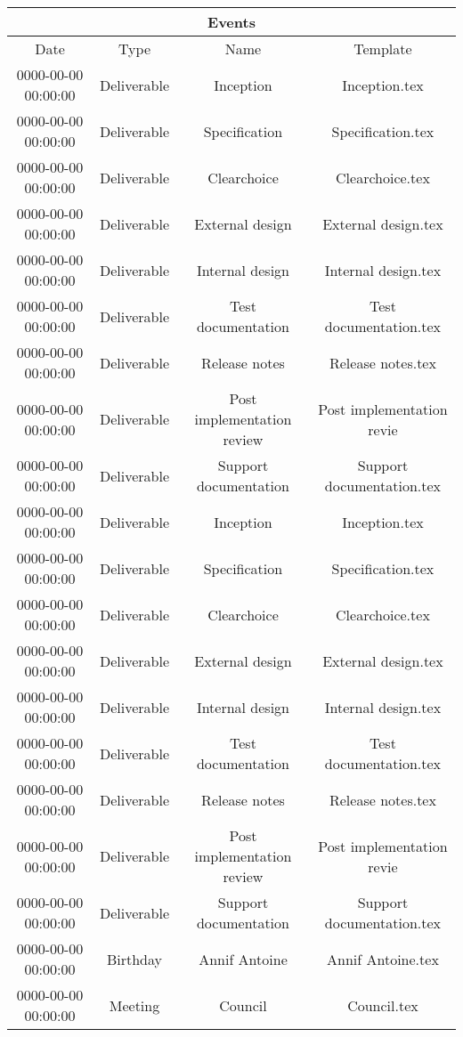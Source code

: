 \begin{longtable}{|c|c|c|c|}
\hline
\multicolumn{4}{|c|}{Events} \\
\hline
Date & Type & Name & Template\\
\hline
0000-00-00 00:00:00 & Deliverable & Inception & Inception.tex\\
\hline
0000-00-00 00:00:00 & Deliverable & Specification & Specification.tex\\
\hline
0000-00-00 00:00:00 & Deliverable & Clearchoice & Clearchoice.tex\\
\hline
0000-00-00 00:00:00 & Deliverable & External design & External design.tex\\
\hline
0000-00-00 00:00:00 & Deliverable & Internal design & Internal design.tex\\
\hline
0000-00-00 00:00:00 & Deliverable & Test documentation & Test documentation.tex\\
\hline
0000-00-00 00:00:00 & Deliverable & Release notes & Release notes.tex\\
\hline
0000-00-00 00:00:00 & Deliverable & Post implementation review & Post implementation revie\\
\hline
0000-00-00 00:00:00 & Deliverable & Support documentation & Support documentation.tex\\
\hline
0000-00-00 00:00:00 & Deliverable & Inception & Inception.tex\\
\hline
0000-00-00 00:00:00 & Deliverable & Specification & Specification.tex\\
\hline
0000-00-00 00:00:00 & Deliverable & Clearchoice & Clearchoice.tex\\
\hline
0000-00-00 00:00:00 & Deliverable & External design & External design.tex\\
\hline
0000-00-00 00:00:00 & Deliverable & Internal design & Internal design.tex\\
\hline
0000-00-00 00:00:00 & Deliverable & Test documentation & Test documentation.tex\\
\hline
0000-00-00 00:00:00 & Deliverable & Release notes & Release notes.tex\\
\hline
0000-00-00 00:00:00 & Deliverable & Post implementation review & Post implementation revie\\
\hline
0000-00-00 00:00:00 & Deliverable & Support documentation & Support documentation.tex\\
\hline
0000-00-00 00:00:00 & Birthday & Annif Antoine & Annif Antoine.tex\\
\hline
0000-00-00 00:00:00 & Meeting & Council & Council.tex\\

\end{longtable}
